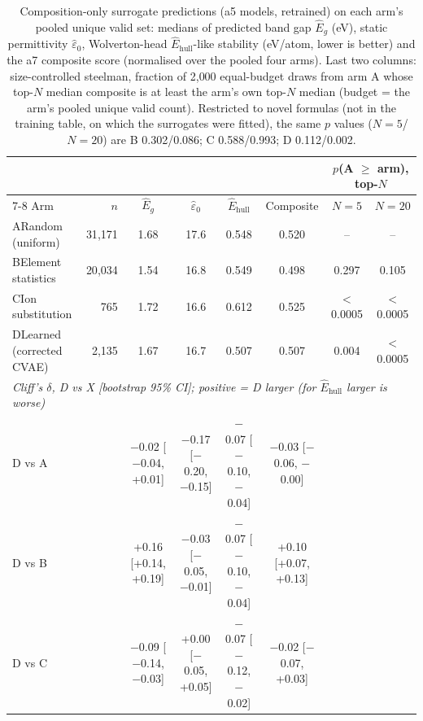 \begin{table}[t]
\centering
\small
\caption{Composition-only surrogate predictions (a5 models, retrained) on each arm's pooled unique valid set: medians of predicted band gap $\hat E_g$ (eV), static permittivity $\hat\varepsilon_0$, Wolverton-head $\hat E_{\mathrm{hull}}$-like stability (eV/atom, lower is better) and the a7 composite score (normalised over the pooled four arms). Last two columns: size-controlled steelman, fraction of 2{,}000 equal-budget draws from arm A whose top-$N$ median composite is at least the arm's own top-$N$ median (budget = the arm's pooled unique valid count). Restricted to novel formulas (not in the training table, on which the surrogates were fitted), the same $p$ values ($N=5$/$N=20$) are B 0.302/0.086; C 0.588/0.993; D 0.112/0.002.}
\label{tab:a9_surrogates}
\begin{tabular}{lrcccccc}
\toprule
 & & & & & & \multicolumn{2}{c}{$p$(A $\geq$ arm), top-$N$} \\
\cmidrule(lr){7-8}
Arm & $n$ & $\hat E_g$ & $\hat\varepsilon_0$ & $\hat E_{\mathrm{hull}}$ & Composite & $N=5$ & $N=20$ \\
\midrule
A\quad Random (uniform) & 31{,}171 & 1.68 & 17.6 & 0.548 & 0.520 & -- & -- \\
B\quad Element statistics & 20{,}034 & 1.54 & 16.8 & 0.549 & 0.498 & 0.297 & 0.105 \\
C\quad Ion substitution & 765 & 1.72 & 16.6 & 0.612 & 0.525 & $<$0.0005 & $<$0.0005 \\
D\quad Learned (corrected CVAE) & 2{,}135 & 1.67 & 16.7 & 0.507 & 0.507 & 0.004 & $<$0.0005 \\
\midrule
\multicolumn{8}{l}{\emph{Cliff's $\delta$, D vs X [bootstrap 95\% CI]; positive = D larger (for $\hat E_{\mathrm{hull}}$ larger is worse)}} \\
D vs A &  & $-$0.02 [$-$0.04, +0.01] & $-$0.17 [$-$0.20, $-$0.15] & $-$0.07 [$-$0.10, $-$0.04] & $-$0.03 [$-$0.06, $-$0.00] &  &  \\
D vs B &  & +0.16 [+0.14, +0.19] & $-$0.03 [$-$0.05, $-$0.01] & $-$0.07 [$-$0.10, $-$0.04] & +0.10 [+0.07, +0.13] &  &  \\
D vs C &  & $-$0.09 [$-$0.14, $-$0.03] & +0.00 [$-$0.05, +0.05] & $-$0.07 [$-$0.12, $-$0.02] & $-$0.02 [$-$0.07, +0.03] &  &  \\
\bottomrule
\end{tabular}
\end{table}
